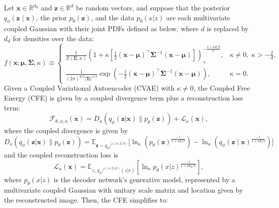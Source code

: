 \documentclass[twoside,11pt]{article}
\begin{document}
\begin{theorem} \label{theorem_CFE}
Let $\boldsymbol{x} \in \mathbb{R}^{d_d}$ and $\mathbf{z} \in \mathbb{R}^d$ be random vectors, and suppose that the posterior $q_{\phi}(\mathbf{z} \mid \boldsymbol{x})$, the prior $p_{\theta}(\mathbf{z})$, and the data $p_\theta(x|z)$ are each multivariate coupled Gaussian with their joint PDFs defined as below, where $d$ is replaced by $d_d$ for densities over the data:
{\small
\begin{equation*}
f\left(\boldsymbol{x}; \boldsymbol{\mu}, \boldsymbol{\Sigma}, \kappa \right) \equiv 
\begin{cases}
\frac{1}{Z(\boldsymbol{\Sigma}, \kappa)}
\left(1 + \kappa \left[\frac{1}{2}(\boldsymbol{x} - \boldsymbol{\mu})^{\intercal}
\boldsymbol{\Sigma}^{-1} (\boldsymbol{x} - \boldsymbol{\mu})\right]\right)_+^{-\frac{1 + \kappa d/2}{\kappa}},
& \kappa \ne 0,\; \kappa > -\frac{2}{d}, \\[0.5em]
\frac{1}{(2\pi)^{d/2} |\boldsymbol{\Sigma}|^{1/2}}
\exp\!\left(-\frac{1}{2}(\boldsymbol{x} - \boldsymbol{\mu})^\top
\boldsymbol{\Sigma}^{-1}(\boldsymbol{x} - \boldsymbol{\mu})\right),
& \kappa = 0.
\end{cases}
\end{equation*}
}
Given a Coupled Variational Autoencoder (CVAE) with $\kappa \neq 0$, the Coupled Free Energy (CFE) is given by a coupled divergence term plus a reconstruction loss term:
\begin{equation}
    \mathcal{F}_{\theta,\phi,\kappa}(\boldsymbol{x}) 
    = 
    D_{\kappa} \left( q_{\phi}(\mathbf{z}|\mathbf{x}) \big\| p_{\theta}(\mathbf{z}) \right) 
    + 
    \mathcal{L}_{\kappa} (\boldsymbol{x}), 
\end{equation}
where the coupled divergence is given by
\begin{equation} \label{divergence}
    D_{\kappa} \left( q_{\phi}(\mathbf{z}|\mathbf{x}) \big\| p_{\theta}(\mathbf{z}) \right)
    =\mathbb{E}_{\mathbf{z} \sim q_\phi/^{\iota(\kappa,2,d)}}
\Big[
\ln_{\kappa}\!\left(p_\theta(\mathbf{z})^{\frac{-1}{1+\kappa d/2}}\right)
-
\ln_{\kappa}\!\left(q_\phi(\mathbf{z}\mid \boldsymbol{x})^{\frac{-1}{1+\kappa d/2}}\right)
\Big]
\end{equation}
and the coupled reconstruction loss is
\begin{equation} \label{reconLoss}
    \mathcal{L}_{\kappa} (\boldsymbol{x}) 
    =\mathbb{E}_{z_\sim q_{\phi}/^{\iota(\kappa,2,d)}(z|x)}
    \left[
    \ln_\kappa p_{\theta}(x|z)^{\frac{-1}{1 + \kappa d_d/2}}
    \right], 
\end{equation}
where $p_{\theta}(x|z)$ is the decoder network's generative model, represented by a multivariate coupled Gaussian with unitary scale matrix and location given by the reconstructed image. Then, the CFE simplifies to:


\end{theorem}
\end{document}
